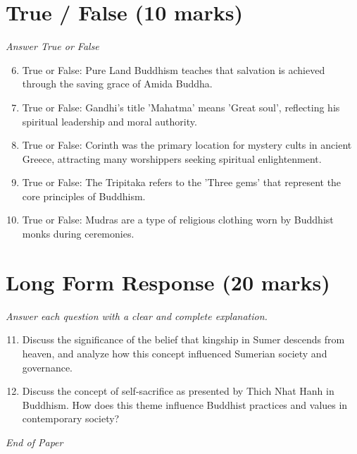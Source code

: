 \documentclass[12pt]{article}
\begin{document}
\section*{True / False (10 marks)}
\textit{Answer True or False}
\begin{enumerate}[label=\arabic*.]
\setcounter{enumi}{5}
\item True or False: Pure Land Buddhism teaches that salvation is achieved through the saving grace of Amida Buddha.
\item True or False: Gandhi's title 'Mahatma' means 'Great soul', reflecting his spiritual leadership and moral authority.
\item True or False: Corinth was the primary location for mystery cults in ancient Greece, attracting many worshippers seeking spiritual enlightenment.
\item True or False: The Tripitaka refers to the 'Three gems' that represent the core principles of Buddhism.
\item True or False: Mudras are a type of religious clothing worn by Buddhist monks during ceremonies.
\end{enumerate}

\section*{Long Form Response (20 marks)}
\textit{Answer each question with a clear and complete explanation.}
\begin{enumerate}[label=\arabic*.]
\setcounter{enumi}{10}
\item Discuss the significance of the belief that kingship in Sumer descends from heaven, and analyze how this concept influenced Sumerian society and governance.
\item Discuss the concept of self-sacrifice as presented by Thich Nhat Hanh in Buddhism. How does this theme influence Buddhist practices and values in contemporary society?
\end{enumerate}

\vfill
\noindent\textit{End of Paper}
\end{document}
